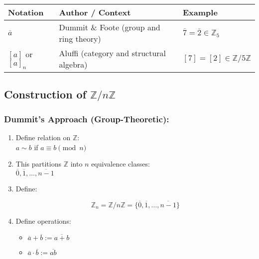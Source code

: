 \documentclass[]{article}
\providecommand{\tightlist}{%
  \setlength{\itemsep}{0pt}\setlength{\parskip}{0pt}}
\begin{document}
\begin{longtable}[]{@{}
  >{\raggedright\arraybackslash}p{}
  >{\raggedright\arraybackslash}p{}
  >{\raggedright\arraybackslash}p{}@{}}
\toprule\noalign{}
\begin{minipage}[b]{\linewidth}\raggedright
Notation
\end{minipage} & \begin{minipage}[b]{\linewidth}\raggedright
Author / Context
\end{minipage} & \begin{minipage}[b]{\linewidth}\raggedright
Example
\end{minipage} \\
\midrule\noalign{}
\endhead
\bottomrule\noalign{}
\endlastfoot
\(\overline{a}\) & Dummit \& Foote (group and ring theory) &
\(\overline{7} = \overline{2} \in \mathbb{Z}_5\) \\
\([a]\) or \([a]_n\) & Aluffi (category and structural algebra) &
\([7] = [2] \in \mathbb{Z}/5\mathbb{Z}\) \\
\end{longtable}

\subsection{\texorpdfstring{Construction of
\(\mathbb{Z}/n\mathbb{Z}\)}{Construction of \textbackslash mathbb\{Z\}/n\textbackslash mathbb\{Z\}}}\label{construction-of-mathbbznmathbbz}

\subsubsection{Dummit's Approach
(Group-Theoretic):}\label{dummits-approach-group-theoretic}

\begin{enumerate}
\def\labelenumi{\arabic{enumi}.}
\item
  Define relation on \(\mathbb{Z}\):\\
  \(a \sim b\) if \(a \equiv b \pmod{n}\)
\item
  This partitions \(\mathbb{Z}\) into \(n\) equivalence classes:\\
  \(\overline{0}, \overline{1}, \dots, \overline{n-1}\)
\item
  Define:

  \[
  \mathbb{Z}_n = \mathbb{Z}/n\mathbb{Z} = \{ \overline{0}, \overline{1}, \dots, \overline{n-1} \}
  \]
\item
  Define operations:

  \begin{itemize}
  \tightlist
  \item
    \(\overline{a} + \overline{b} := \overline{a + b}\)
  \item
    \(\overline{a} \cdot \overline{b} := \overline{ab}\)
  \end{itemize}
\end{enumerate}
\end{document}
